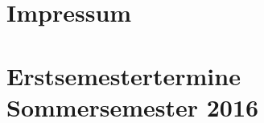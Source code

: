\documentclass{fsinewsletter}
\begin{document}
\newpage
\section{Impressum}


%
\newpage
\section{Erstsemestertermine Sommersemester 2016}

\end{document}
